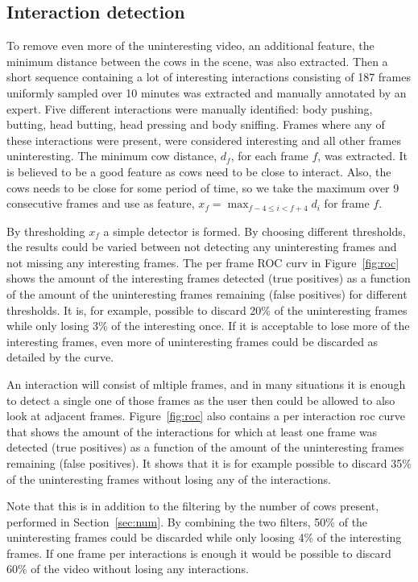 \documentclass{cta-author}
\begin{document}
\subsection{Interaction detection}
To remove even more of the uninteresting video, an additional feature, the minimum distance between the cows
in the scene, was also extracted. Then a short sequence containing a lot of interesting interactions
consisting of 187 frames uniformly sampled over 10 minutes was extracted and manually annotated by an expert.
Five different interactions were manually identified: body pushing, butting, head butting, head pressing and
body sniffing. Frames where any of these interactions were present, were considered interesting and all other
frames uninteresting. The minimum cow distance, $d_f$, for each frame $f$, was extracted. It is believed to
be a good feature as cows need to be close to interact. Also, the cows needs to be close for some period of
time, so we take the maximum over 9 consecutive frames and use as feature,
$x_f = \max_{f-4 \leq i < f+4} d_i$ for frame $f$.

By thresholding $x_f$ a simple detector is formed. By choosing different thresholds, the results could be
varied between not detecting any uninteresting frames and not missing any interesting frames. The per frame
ROC curv in Figure~\ref{fig:roc} shows the amount of the interesting frames detected (true positives) as a
function of the amount of the uninteresting frames remaining (false positives) for different thresholds. It
is, for example, possible to discard 20\% of the uninteresting frames while only losing 3\% of the
interesting once. If it is acceptable to lose more of the interesting frames, even more of uninteresting
frames could be discarded as detailed by the curve.

An interaction will consist of mltiple frames, and in many situations it is enough to detect a single one
of those frames as the user then could be allowed to also look at adjacent frames. Figure~\ref{fig:roc} also
contains a per interaction roc curve that shows the amount of the interactions for which at least one frame
was detected (true positives) as a function of the amount of the uninteresting frames remaining (false
positives). It shows that it is for example possible to discard 35\% of the uninteresting frames without
losing any of the interactions.

Note that this is in addition to the filtering by the number of cows present, performed in
Section~\ref{sec:num}. By combining the two filters, 50\% of the uninteresting frames could be discarded
while only loosing 4\% of the interesting frames. If one frame per interactions is enough it would be
possible to discard 60\% of the video without losing any interactions.
\end{document}
